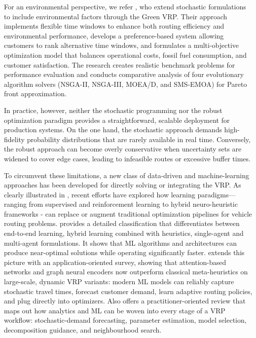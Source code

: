 \documentclass[preprint,12pt]{elsarticle}
\begin{document}
For an environmental perspective, we refer \cite{Gulmez-et-al}, who extend stochastic formulations to include environmental factors through the Green VRP. Their approach implements flexible time windows to enhance both routing efficiency and environmental performance, develops a preference-based system allowing customers to rank alternative time windows, and formulates a multi-objective optimization model that balances operational costs, fossil fuel consumption, and customer satisfaction. The research creates realistic benchmark problems for performance evaluation and conducts comparative analysis of four evolutionary algorithm solvers (NSGA-II, NSGA-III, MOEA/D, and SMS-EMOA) for Pareto front approximation.




\bigskip

In practice, however, neither the stochastic programming nor the robust optimization paradigm provides a straightforward, scalable deployment for production systems. On the one hand, the stochastic approach demands high-fidelity probability distributions \cite{CSO} that are rarely available in real time. Conversely, the robust approach can become overly conservative when uncertainty sets are widened to cover edge cases, leading to infeasible routes or excessive buffer times.



To circumvent these limitations, a new class of data-driven and machine-learning approaches has been developed for directly solving or integrating the VRP.  As clearly illustrated in \cite{Bai2021, Bogyrbayeva2024,Shahbazian2024}, recent efforts have explored how learning paradigms—ranging from supervised and reinforcement learning to hybrid neuro-heuristic frameworks - can replace or augment traditional optimization pipelines for vehicle routing problems.
\cite{Bogyrbayeva2024} provides a detailed classification that differentiates between end-to-end learning, hybrid learning combined with heuristics, single-agent and multi-agent formulations. It shows that ML algorithms and architectures can produce near-optimal solutions while operating significantly faster.
\cite{Shahbazian2024} extends this picture with an application-oriented survey, showing that attention-based networks and graph neural encoders now outperform classical meta-heuristics on large-scale, dynamic VRP variants: modern ML models can reliably capture stochastic travel times, forecast customer demand, learn adaptive routing policies, and plug directly into optimizers. Also \cite{Bai2021} offers a practitioner-oriented review that maps out how analytics and ML can be woven into every stage of a VRP workflow: stochastic-demand forecasting, parameter estimation, model selection, decomposition guidance, and neighbourhood search.
\end{document}

